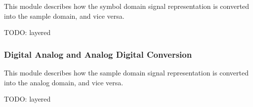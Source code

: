 This module describes how the symbol domain signal representation is converted
into the sample domain, and vice versa.

TODO: layered


\subsubsection{Digital Analog and Analog Digital Conversion}

This module describes how the sample domain signal representation is converted
into the analog domain, and vice versa.

TODO: layered

\fi



